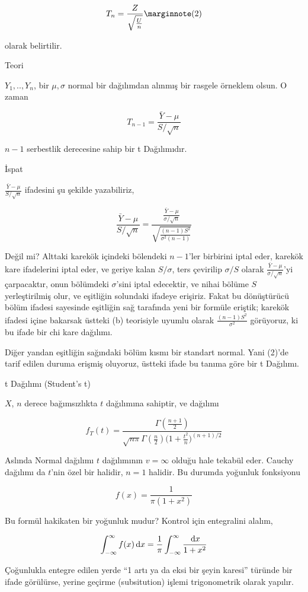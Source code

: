 \documentclass[12pt,fleqn]{article}\usepackage{../../common}
\begin{document}
$$ 
T_n = \frac{Z}{\sqrt{ \frac{U}{n}}} 
\mlabel{2} 
$$

olarak belirtilir.

Teori

$Y_1,..,Y_n$, bir $\mu,\sigma$ normal bir dağılımdan alınmış bir rasgele
örneklem olsun. O zaman 

$$ T_{n-1} = \frac{\bar{Y}-\mu}{S/\sqrt{n}}$$

$n-1$ serbestlik derecesine sahip bir t Dağılımıdır. 

İspat

$\frac{\bar{Y}-\mu}{S/\sqrt{n}}$ ifadesini şu şekilde yazabiliriz, 

$$ \frac{\bar{Y}-\mu}{S/\sqrt{n}} =
\frac{\frac{\bar{Y}-\mu}{\sigma/\sqrt{n}} }
{\sqrt{\frac{(n-1)S^2}{\sigma^2(n-1)}}}
$$

Değil mi? Alttaki karekök içindeki bölendeki $n-1$'ler birbirini iptal
eder, karekök kare ifadelerini iptal eder, ve geriye kalan $S/\sigma$, ters
çevirilip $\sigma/S$ olarak $\frac{\bar{Y}-\mu}{\sigma/\sqrt{n}}$'yi
çarpacaktır, onun bölümdeki $\sigma$'sini iptal edecektir, ve nihai bölüme
$S$ yerleştirilmiş olur, ve eşitliğin solundaki ifadeye erişiriz. Fakat bu
dönüştürücü bölüm ifadesi sayesinde eşitliğin sağ tarafında yeni bir
formüle eriştik; karekök ifadesi içine bakarsak üstteki (b) teorisiyle
uyumlu olarak $\frac{(n-1)S^2}{\sigma^2}$ görüyoruz, ki bu ifade bir chi
kare dağılımı.

Diğer yandan eşitliğin sağındaki bölüm kısmı bir standart normal. Yani
(2)'de tarif edilen duruma erişmiş oluyoruz, üstteki ifade bu tanıma göre
bir t Dağılımı. 

t Dağılımı (Student's t) 

$X$, $n$ derece bağımsızlıkta $t$ dağılımına sahiptir, ve dağılımı

$$ 
f_T(t) = 
\frac
{
\Gamma(\frac{n+1}{2})
}
{
\sqrt{n\pi}\Gamma(\frac{n}{2})
\bigg(1+\frac{t^2}{n}\bigg)^{(n+1)/2}
}
 $$

Aslında Normal dağılımı $t$ dağılımının $v = \infty$ olduğu hale tekabül
eder. Cauchy dağılımı da $t$'nin özel bir halidir, $n = 1$ halidir. Bu
durumda yoğunluk fonksiyonu

$$ f(x)  = \frac{ 1}{\pi(1+ x^2)} $$

Bu formül hakikaten bir yoğunluk mudur? Kontrol için entegralini alalım, 

$$
\int _{ -\infty}^{\infty} f(x) \,\mathrm{d} x = 
\frac{ 1}{\pi} \int _{ -\infty}^{\infty} \frac{\,\mathrm{d} x}{1 + x^2} 
$$

Çoğunlukla entegre edilen yerde  ``1 artı ya da eksi bir şeyin karesi''
türünde  bir ifade görülürse, yerine geçirme (subsitution) işlemi
trigonometrik  olarak  yapılır. 
\end{document}
